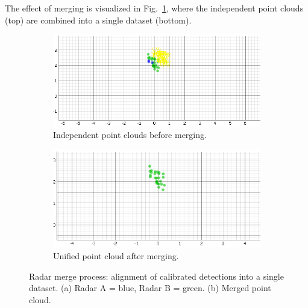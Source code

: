 The effect of merging is visualized in Fig.~\ref{fig:radar_merge}, where the independent point clouds (top) are combined into a single dataset (bottom).  

\begin{figure}[!htbp]
    \centering
    \begin{subfigure}[t]{0.8\linewidth}
        \centering
        \includegraphics[width=\linewidth]{images/AFTERdualSensorCalib_2mts.png}
        \caption{Independent point clouds before merging.}
    \end{subfigure}
    \vfill
    \begin{subfigure}[t]{0.8\linewidth}
        \centering
        \includegraphics[width=\linewidth]{images/AFTERdualSensorCalibCluster_2mts.png}
        \caption{Unified point cloud after merging.}
    \end{subfigure}
    \caption{Radar merge process: alignment of calibrated detections into a single dataset. (a) Radar A = blue, Radar B = green. (b) Merged point cloud.}
    \label{fig:radar_merge}
\end{figure}

